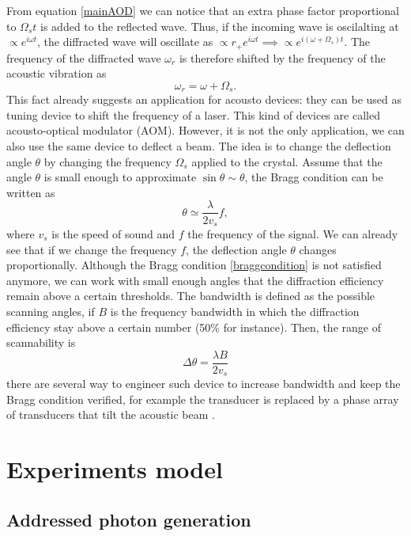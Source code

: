 From equation \eqref{mainAOD} we can notice that an extra phase factor proportional to $\Omega_s t$ is added to the reflected wave. Thus, if the incoming wave is oscilalting at $\propto e^{i\omega t}$, the diffracted wave will oscillate as $\propto r_{+}e^{i\omega t} \implies \propto e^{i(\omega + \Omega_s )t}$. The frequency of the diffracted wave $\omega_r$ is therefore shifted by the frequency of the acoustic vibration as
\begin{equation}
\omega_r  =  \omega + \Omega_s.
\end{equation}
This fact already suggests an application for acousto devices: they can be used as tuning device to shift the frequency of a laser. This kind of devices are called acousto-optical modulator (AOM). However, it is not the only application, we can also use the same device to deflect a beam. The idea is to change the deflection angle $\theta$ by changing the frequency $\Omega_s$ applied to the crystal.
Assume that the angle $\theta$ is small enough to approximate $\sin\theta \sim \theta$, the Bragg condition can be written as
\begin{equation}
\theta \simeq \frac{\lambda}{2 v_s}f,
\end{equation}
where $v_s$ is the speed of sound and $f$ the frequency of the signal. We can already see that if we change the frequency $f$, the deflection angle $\theta$ changes proportionally. Although the Bragg condition \eqref{braggcondition} is not satisfied anymore, we can work with small enough angles that the diffraction efficiency remain above a certain thresholds. The bandwidth is defined as the possible scanning angles, if $B$ is the frequency bandwidth in which the diffraction efficiency stay above a certain number (50\% for instance). Then, the range of scannability is
\begin{equation}
\Delta\theta = \frac{\lambda B}{2v_s}
\end{equation}
there are several way to engineer such device to increase bandwidth and keep the Bragg condition verified, for example the transducer is replaced by a phase array of transducers that tilt the acoustic beam \cite{phasedarray}.

\section{Experiments model}
\subsection{Addressed photon generation}

